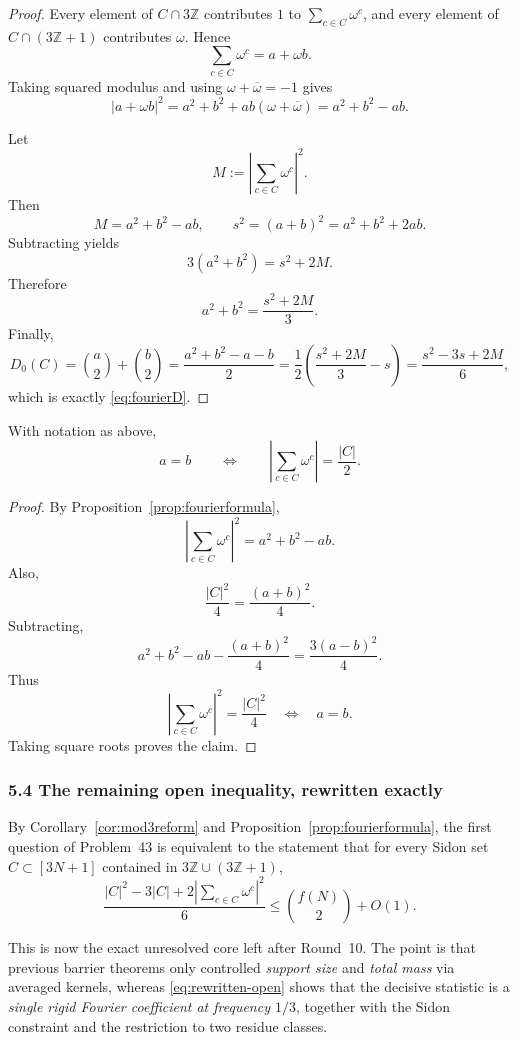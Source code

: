 \begin{proof}
Every element of $C\cap 3\mathbb Z$ contributes $1$ to $\sum_{c\in C}\omega^c$, and every element of $C\cap(3\mathbb Z+1)$ contributes $\omega$.  Hence
\[
\sum_{c\in C}\omega^c=a+\omega b.
\]
Taking squared modulus and using $\omega+\overline\omega=-1$ gives
\[
\left|a+\omega b\right|^2
=a^2+b^2+ab(\omega+\overline\omega)
=a^2+b^2-ab.
\]

Let
\[
M:=\left|\sum_{c\in C}\omega^c\right|^2.
\]
Then
\[
M=a^2+b^2-ab,
\qquad
s^2=(a+b)^2=a^2+b^2+2ab.
\]
Subtracting yields
\[
3(a^2+b^2)=s^2+2M.
\]
Therefore
\[
a^2+b^2=\frac{s^2+2M}{3}.
\]
Finally,
\[
D_0(C)=\binom{a}{2}+\binom{b}{2}=\frac{a^2+b^2-a-b}{2}
=\frac{1}{2}\left(\frac{s^2+2M}{3}-s\right)
=\frac{s^2-3s+2M}{6},
\]
which is exactly \eqref{eq:fourierD}.
\end{proof}

\begin{corollary}
\label{cor:equalsizefourier}
With notation as above,
\[
a=b
\qquad\Longleftrightarrow\qquad
\left|\sum_{c\in C}\omega^c\right|=\frac{|C|}{2}.
\]
\end{corollary}

\begin{proof}
By Proposition~\ref{prop:fourierformula},
\[
\left|\sum_{c\in C}\omega^c\right|^2=a^2+b^2-ab.
\]
Also,
\[
\frac{|C|^2}{4}=\frac{(a+b)^2}{4}.
\]
Subtracting,
\[
a^2+b^2-ab-\frac{(a+b)^2}{4}
=\frac{3(a-b)^2}{4}.
\]
Thus
\[
\left|\sum_{c\in C}\omega^c\right|^2=\frac{|C|^2}{4}
\quad\Longleftrightarrow\quad a=b.
\]
Taking square roots proves the claim.
\end{proof}

\subsubsection{5.4 The remaining open inequality, rewritten exactly}

By Corollary~\ref{cor:mod3reform} and Proposition~\ref{prop:fourierformula}, the first question of Problem~43 is equivalent to the statement that for every Sidon set $C\subset [3N+1]$ contained in $3\mathbb Z\cup(3\mathbb Z+1)$,
\begin{equation}
\label{eq:rewritten-open}
\frac{|C|^2-3|C|+2\left|\sum_{c\in C}\omega^c\right|^2}{6}
\le
\binom{f(N)}{2}+O(1).
\end{equation}

This is now the exact unresolved core left after Round~10.  The point is that previous barrier theorems only controlled \emph{support size} and \emph{total mass} via averaged kernels, whereas \eqref{eq:rewritten-open} shows that the decisive statistic is a \emph{single rigid Fourier coefficient at frequency $1/3$}, together with the Sidon constraint and the restriction to two residue classes.

